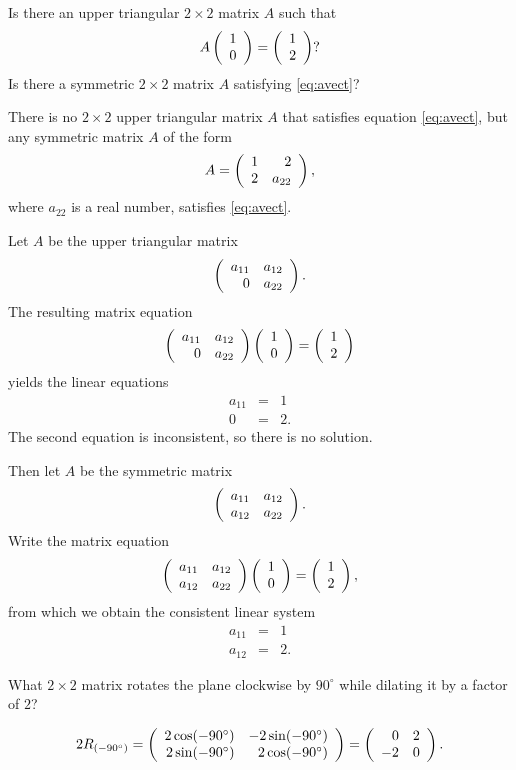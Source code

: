 \documentclass{article}
\begin{document}



\problemlabel

\begin{exercise} \label{c4.1.9}
Is there an upper triangular $2\times 2$ matrix $A$ such that
\begin{equation}  \label{eq:avect}
A\left(\begin{array}{r} 1 \\ 0\end{array}\right) = \left(\begin{array}{r} 1 \\ 2\end{array}\right)?
\end{equation}
Is there a symmetric $2\times 2$ matrix $A$ satisfying \eqref{eq:avect}?

\begin{solution}

\ans There is no $2 \times 2$ upper triangular matrix $A$ that
satisfies equation \eqref{eq:avect}, but any symmetric matrix $A$ of the form
\[ A = \left(\begin{array}{rr} 1 & 2\\ 2 &a_{22}\end{array}\right), \]
where $a_{22}$ is a real number, satisfies \eqref{eq:avect}.

\soln Let $A$ be the upper triangular matrix
\[ \left(\begin{array}{rr} a_{11} & a_{12}\\ 0 &a_{22}\end{array}\right). \]
The resulting matrix equation
\[ \left(\begin{array}{rr} a_{11} & a_{12}\\ 0 &a_{22}\end{array}\right)
\left(\begin{array}{r} 1 \\ 0\end{array}\right) = \left(\begin{array}{r} 1 \\ 2\end{array}\right) \]
yields the linear equations
\[ \begin{array}{rcl}
a_{11} & = & 1 \\
0 & = & 2.\end{array} \]
The second equation is inconsistent, so there is no solution.

\para Then let $A$ be the symmetric matrix
\[ \left(\begin{array}{rr} a_{11} & a_{12}\\ a_{12} &a_{22}\end{array}\right). \]
Write the matrix equation
\[ \left(\begin{array}{rr} a_{11} & a_{12}\\ a_{12} &a_{22}\end{array}\right)
\left(\begin{array}{r} 1 \\ 0\end{array}\right) = \left(\begin{array}{r} 1 \\ 2\end{array}\right), \]
from which we obtain the consistent linear system
\[ \begin{array}{rcl}
a_{11} & = & 1 \\
a_{12} & = & 2.\end{array} \]

\end{solution}
\end{exercise}





\problemlabel

\begin{exercise} \label{c4.2.1c}
What $2\times 2$ matrix rotates the plane clockwise by $90^\circ$ while
dilating it by a factor of $2$?

\begin{solution}
\ans
\[
2R_{(-90^\circ)} = \left(\begin{array}{rr} 2\cos (-90^\circ) & -2\sin
(-90^\circ)\\ 2\sin (-90^\circ) &2\cos (-90^\circ)\end{array}\right) = \left(\begin{array}{rr} 0 & 2\\ -2 &0\end{array}\right).
\]

\end{solution}
\end{exercise}
\end{document}
